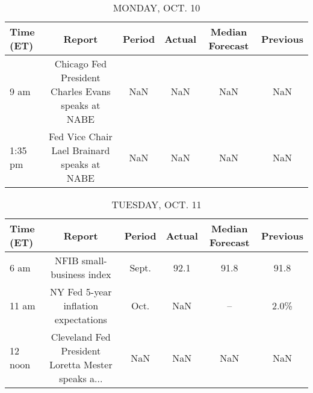 \documentclass{article}%
\begin{document}
%
\normalsize%


\begin{table}[htbp]%
\caption{MONDAY, OCT. 10}%
\centering%
\begin{adjustbox}{width=1\textwidth}%
\begin{tabular}{lccccc}
\toprule
Time (ET) &                                             Report & Period & Actual & Median Forecast & Previous \\
\midrule
     9 am & Chicago Fed President Charles Evans speaks at NABE &    NaN &    NaN &             NaN &      NaN \\
  1:35 pm &        Fed Vice Chair Lael Brainard speaks at NABE &    NaN &    NaN &             NaN &      NaN \\
\bottomrule
\end{tabular}
%
\end{adjustbox}%
\end{table}

%


\begin{table}[htbp]%
\caption{TUESDAY, OCT. 11}%
\centering%
\begin{adjustbox}{width=1\textwidth}%
\begin{tabular}{lccccc}
\toprule
Time (ET) &                                             Report & Period & Actual & Median Forecast & Previous \\
\midrule
     6 am &                          NFIB small-business index &  Sept. &   92.1 &            91.8 &     91.8 \\
    11 am &               NY Fed 5-year inflation expectations &   Oct. &    NaN &              -- &     2.0\% \\
  12 noon & Cleveland Fed President Loretta Mester speaks a... &    NaN &    NaN &             NaN &      NaN \\
\bottomrule
\end{tabular}
%
\end{adjustbox}%
\end{table}

%
\end{document}
